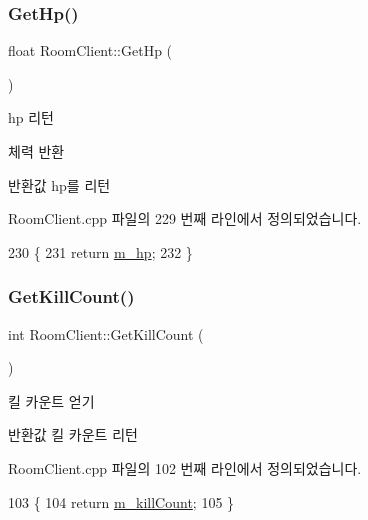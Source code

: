 \subsubsection{\texorpdfstring{Get\+Hp()}{GetHp()}}
{\footnotesize\ttfamily float Room\+Client\+::\+Get\+Hp (\begin{DoxyParamCaption}{ }\end{DoxyParamCaption})}



hp 리턴 

체력 반환

\begin{DoxyReturn}{반환값}
hp를 리턴 
\end{DoxyReturn}


Room\+Client.\+cpp 파일의 229 번째 라인에서 정의되었습니다.


\begin{DoxyCode}
230 \{
231     \textcolor{keywordflow}{return} \hyperlink{class_room_client_a2b4f07062f9927aa30772306a1b9d18a}{m\_hp};
232 \}
\end{DoxyCode}
\mbox{\label{class_room_client_aa83650c93a773c1e2bf80503d54137b4}} 
\subsubsection{\texorpdfstring{Get\+Kill\+Count()}{GetKillCount()}}
{\footnotesize\ttfamily int Room\+Client\+::\+Get\+Kill\+Count (\begin{DoxyParamCaption}{ }\end{DoxyParamCaption})}



킬 카운트 얻기 

\begin{DoxyReturn}{반환값}
킬 카운트 리턴 
\end{DoxyReturn}


Room\+Client.\+cpp 파일의 102 번째 라인에서 정의되었습니다.


\begin{DoxyCode}
103 \{
104     \textcolor{keywordflow}{return} \hyperlink{class_room_client_a221340e3b573d5b8e3c09fcc16bbb01b}{m\_killCount};
105 \}
\end{DoxyCode}
\mbox{\label{class_room_client_ac7e064c639bf2bf2f2d5fdfceb75645b}} 
